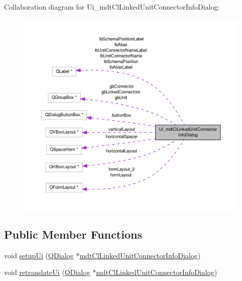 Collaboration diagram for Ui\-\_\-mdt\-Cl\-Linked\-Unit\-Connector\-Info\-Dialog\-:
\nopagebreak
\begin{figure}[H]
\begin{center}
\leavevmode
\includegraphics[width=350pt]{class_ui__mdt_cl_linked_unit_connector_info_dialog__coll__graph}
\end{center}
\end{figure}
\subsection*{Public Member Functions}
\begin{DoxyCompactItemize}
\item 
void \hyperlink{class_ui__mdt_cl_linked_unit_connector_info_dialog_af63f98d19039f96eef84c6afafec9694}{setup\-Ui} (\hyperlink{class_q_dialog}{Q\-Dialog} $\ast$\hyperlink{classmdt_cl_linked_unit_connector_info_dialog}{mdt\-Cl\-Linked\-Unit\-Connector\-Info\-Dialog})
\item 
void \hyperlink{class_ui__mdt_cl_linked_unit_connector_info_dialog_ae2fb73cec9e79490fef57de410162516}{retranslate\-Ui} (\hyperlink{class_q_dialog}{Q\-Dialog} $\ast$\hyperlink{classmdt_cl_linked_unit_connector_info_dialog}{mdt\-Cl\-Linked\-Unit\-Connector\-Info\-Dialog})
\end{DoxyCompactItemize}
